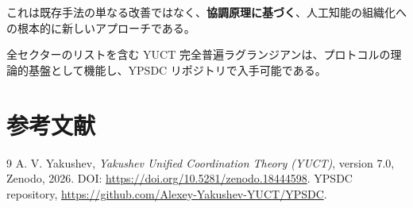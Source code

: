 \documentclass[13pt,a4paper]{ltjsarticle}
\begin{document}
	これは既存手法の単なる改善ではなく、\textbf{協調原理に基づく}、人工知能の組織化への根本的に新しいアプローチである。
	
	全セクターのリストを含む YUCT 完全普遍ラグランジアンは、プロトコルの理論的基盤として機能し、YPSDC リポジトリで入手可能である。
	
	\section*{参考文献}
	\begin{thebibliography}{9}
		A. V. Yakushev, \emph{Yakushev Unified Coordination Theory (YUCT)}, version 7.0, Zenodo, 2026. DOI: \url{https://doi.org/10.5281/zenodo.18444598}.
		YPSDC repository, \url{https://github.com/Alexey-Yakushev-YUCT/YPSDC}.
	\end{thebibliography}
	
\end{document}
